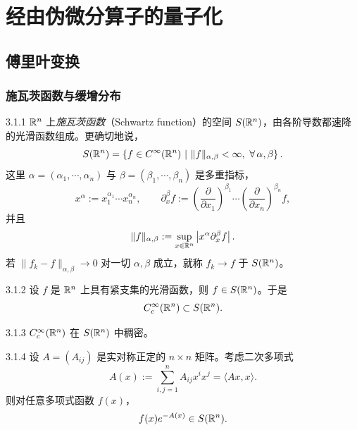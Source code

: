

\chapter{经由伪微分算子的量子化}

\section{傅里叶变换}

\subsection{施瓦茨函数与缓增分布}

\begin{definition}{3.1.1}
$\mathbb{R}^n$ 上\emph{施瓦茨函数}（Schwartz function）的空间 $S(\mathbb{R}^n)$，由各阶导数都速降的光滑函数组成。更确切地说，
\[
S(\R^n)=\left\{f\in C^\infty(\R^n)\ \middle|\ \|f\|_{\alpha,\beta}<\infty,\ \forall\,\alpha,\beta\right\}.
\]
这里 $\alpha=(\alpha_1,\cdots,\alpha_n)$ 与 $\beta=(\beta_1,\cdots,\beta_n)$ 是多重指标，
\[
x^\alpha:=x_1^{\alpha_1}\cdots x_n^{\alpha_n},\qquad
\partial^\beta_{x}f:=\left(\frac{\partial}{\partial x_1}\right)^{\beta_1}\cdots\left(\frac{\partial}{\partial x_n}\right)^{\beta_n}f,
\]
并且
\[
\|f\|_{\alpha,\beta}:=\sup_{x\in\mathbb{R}^n}\left|x^\alpha\partial^\beta_{x}f\right|.
\]
若 $\|f_k-f\|_{\alpha,\beta}\to0$ 对一切 $\alpha,\beta$ 成立，就称 $f_k\to f$ 于 $S(\mathbb{R}^n)$。
\end{definition}

\begin{example}{3.1.2}
设 $f$ 是 $\mathbb{R}^n$ 上具有紧支集的光滑函数，则 $f\in S(\mathbb{R}^n)$。于是
\[
C_c^\infty(\mathbb{R}^n)\subset S(\mathbb{R}^n).
\]
\end{example}

\begin{proposition}{3.1.3}
$C_c^\infty(\mathbb{R}^n)$ 在 $S(\mathbb{R}^n)$ 中稠密。
\end{proposition}

\begin{example}{3.1.4}
设 $A=(A_{ij})$ 是实对称正定的 $n\times n$ 矩阵。考虑二次多项式
\[
A(x):=\sum_{i,j=1}^n A_{ij}x^ix^j=\langle Ax,x\rangle.
\]
则对任意多项式函数 $f(x)$，
\[
f(x)e^{-A(x)}\in S(\mathbb{R}^n).
\]
\end{example}

